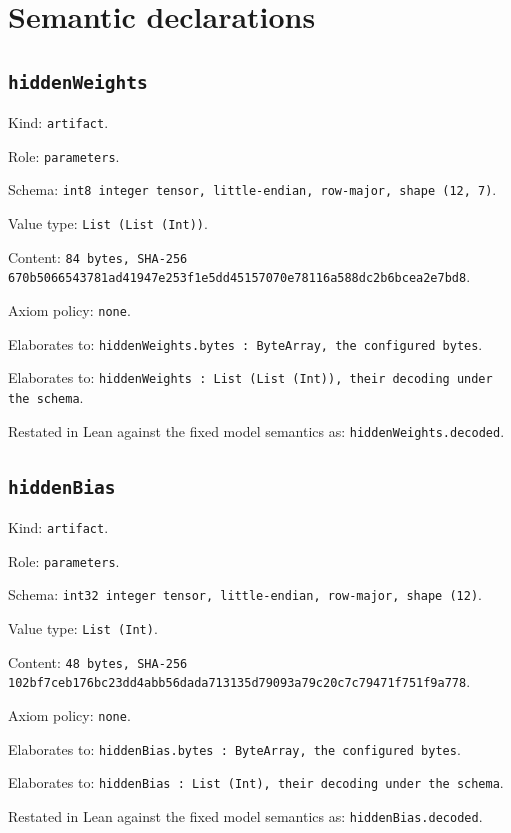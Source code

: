 \documentclass[11pt]{article}
\begin{document}
\section*{Semantic declarations}
\subsection*{\texttt{hiddenWeights}}
\noindent Kind: \texttt{artifact}.\par
\noindent Role: \texttt{parameters}.\par
\noindent Schema: \texttt{int8 integer tensor, little-endian, row-major, shape (12, 7)}.\par
\noindent Value type: \texttt{List (List (Int))}.\par
\noindent Content: \texttt{84 bytes, SHA-256 670b5066543781ad41947e253f1e5dd45157070e78116a588dc2b6bcea2e7bd8}.\par
\noindent Axiom policy: \texttt{none}.\par
\noindent Elaborates to: \texttt{hiddenWeights.bytes : ByteArray, the configured bytes}.\par
\noindent Elaborates to: \texttt{hiddenWeights : List (List (Int)), their decoding under the schema}.\par
\noindent Restated in Lean against the fixed model semantics as: \texttt{hiddenWeights.decoded}.\par
\subsection*{\texttt{hiddenBias}}
\noindent Kind: \texttt{artifact}.\par
\noindent Role: \texttt{parameters}.\par
\noindent Schema: \texttt{int32 integer tensor, little-endian, row-major, shape (12)}.\par
\noindent Value type: \texttt{List (Int)}.\par
\noindent Content: \texttt{48 bytes, SHA-256 102bf7ceb176bc23dd4abb56dada713135d79093a79c20c7c79471f751f9a778}.\par
\noindent Axiom policy: \texttt{none}.\par
\noindent Elaborates to: \texttt{hiddenBias.bytes : ByteArray, the configured bytes}.\par
\noindent Elaborates to: \texttt{hiddenBias : List (Int), their decoding under the schema}.\par
\noindent Restated in Lean against the fixed model semantics as: \texttt{hiddenBias.decoded}.\par
\end{document}
